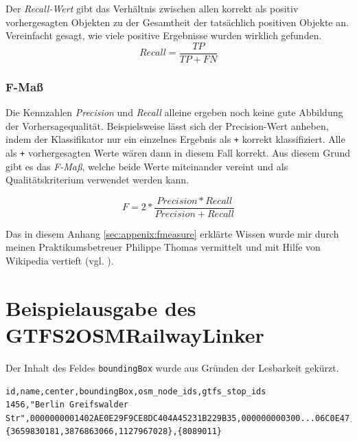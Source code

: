 Der \textit{Recall-Wert} gibt das Verhältnis zwischen allen korrekt als positiv vorhergesagten Objekten zu der Gesamtheit der tatsächlich positiven Objekte an. Vereinfacht gesagt, wie viele positive Ergebnisse wurden wirklich gefunden.
$$Recall = \frac{TP}{TP + FN}$$

\subsubsection{F-Maß}

Die Kennzahlen \textit{Precision} und \textit{Recall} alleine ergeben noch keine gute Abbildung der Vorhersagequalität.
Beispielsweise lässt sich der Precision-Wert anheben, indem der Klassifikator nur ein einzelnes Ergebnis als \texttt{+} korrekt klassifiziert.
Alle als \texttt{+} vorhergesagten Werte wären dann in diesem Fall korrekt.
Aus diesem Grund gibt es das \textit{F-Maß}, welche beide Werte miteinander vereint und als Qualitätskriterium verwendet werden kann.

$$F = 2 * \frac{Precision * Recall}{Precision + Recall}$$

Das in diesem Anhang \ref{sec:appenix:fmeasure} erklärte Wissen wurde mir durch meinen Praktikumsbetreuer Philippe Thomas vermittelt und mit Hilfe von Wikipedia vertieft (vgl. \cite{ wiki:fmeasure}).

\section{Beispielausgabe des GTFS2OSMRailwayLinker}
\label{sec:appendix:gtfs2osm_example}
Der Inhalt des Feldes \texttt{boundingBox} wurde aus Gründen der Lesbarkeit gekürzt.
\lstset{
  language=,
  numbers=left,
  caption=Ausgabe des GTFS2OSMRailwayLinker,
  label=,
}
\begin{lstlisting}
id,name,center,boundingBox,osm_node_ids,gtfs_stop_ids
1456,"Berlin Greifswalder Str",0000000001402AE0E29F9CE8DC404A45231B229B35,000000000300...06C0E47,{3659830181,3876863066,1127967028},{8089011}
\end{lstlisting}

